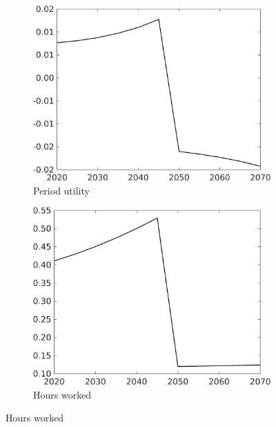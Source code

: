 \begin{figure}[h!!!]
\begin{subfigure}[]{0.32\textwidth}
	\end{subfigure}
	\begin{subfigure}[]{0.32\textwidth}
		\caption{Period utility }
		\includegraphics[width=1\textwidth]{../../codding_model/own_basedOnFried/optimalPol_010922_revision/figures/all_13Sept22_Tplus30/SWF_OPT_COMPtaulPer_regime4_spillover0_knspil1_noskill1_sep0_xgrowth0_PV1_etaa0.79.png}
	\end{subfigure}
	\begin{subfigure}[]{0.32\textwidth}
		\caption{ Hours worked }
		\includegraphics[width=1\textwidth]{../../codding_model/own_basedOnFried/optimalPol_010922_revision/figures/all_13Sept22_Tplus30/hh_OPT_COMPtaulPer_regime4_spillover0_knspil1_noskill1_sep0_xgrowth0_PV1_etaa0.79.png}

\end{subfigure}
\end{figure}
